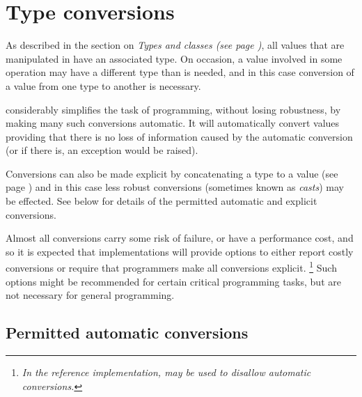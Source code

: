 \chapter{Type conversions}\label{refconv}
 
As described in the section on  \emph{Types and classes (see page \pageref{reftypes})}, all values that are manipulated in \nr{} have an
associated type.  On occasion, a value involved in some operation may
have a different type than is needed, and in this case conversion of
a value from one type to another is necessary.
 
\nr{} considerably simplifies the task of programming, without losing
robustness, by making many such conversions automatic.  It will
automatically convert values providing that there is no loss of
information caused by the automatic conversion (or if there is, an
exception would be raised).
 
\index{,}
Conversions can also be made explicit by concatenating
a type to a value  (see page \pageref{reftypeops}) and in this case less robust conversions
(sometimes known as \emph{casts}) may be effected.
See below for details of the permitted automatic and explicit
conversions.
 
Almost all conversions carry some risk of failure, or have a performance
cost, and so it is expected that implementations will provide options to
either report costly conversions or require that programmers make all
conversions explicit.
\footnote{
\emph{In the reference implementation,  may be
used to disallow automatic conversions.}
}
Such options might be recommended for certain critical programming
tasks, but are not necessary for general programming.
\section{Permitted automatic conversions}
 
